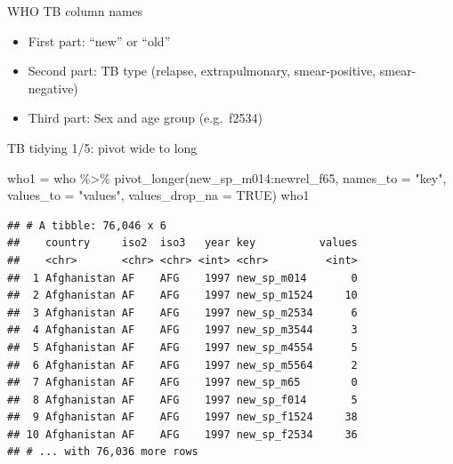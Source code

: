 \documentclass[
  ignorenonframetext,
]{beamer}
\newenvironment{Shaded}{\begin{snugshade}}{\end{snugshade}}
\newcommand{\AttributeTok}[1]{\textcolor[rgb]{0.77,0.63,0.00}{#1}}
\newcommand{\ConstantTok}[1]{\textcolor[rgb]{0.00,0.00,0.00}{#1}}
\newcommand{\FunctionTok}[1]{\textcolor[rgb]{0.00,0.00,0.00}{#1}}
\newcommand{\NormalTok}[1]{#1}
\newcommand{\OtherTok}[1]{\textcolor[rgb]{0.56,0.35,0.01}{#1}}
\newcommand{\SpecialCharTok}[1]{\textcolor[rgb]{0.00,0.00,0.00}{#1}}
\newcommand{\StringTok}[1]{\textcolor[rgb]{0.31,0.60,0.02}{#1}}
\providecommand{\tightlist}{%
  \setlength{\itemsep}{0pt}\setlength{\parskip}{0pt}}
\begin{document}
\begin{frame}{WHO TB column names}
\protect\hypertarget{who-tb-column-names}{}
\begin{itemize}
\tightlist
\item
  First part: ``new'' or ``old''
\item
  Second part: TB type (relapse, extrapulmonary, smear-positive,
  smear-negative)
\item
  Third part: Sex and age group (e.g.~f2534)
\end{itemize}
\end{frame}

\begin{frame}[fragile]{TB tidying 1/5: pivot wide to long}
\protect\hypertarget{tb-tidying-15-pivot-wide-to-long}{}
\begin{Shaded}
\begin{Highlighting}[]
\NormalTok{who1 }\OtherTok{=}\NormalTok{ who }\SpecialCharTok{\%\textgreater{}\%} 
  \FunctionTok{pivot\_longer}\NormalTok{(new\_sp\_m014}\SpecialCharTok{:}\NormalTok{newrel\_f65, }
               \AttributeTok{names\_to =} \StringTok{"key"}\NormalTok{, }
               \AttributeTok{values\_to =} \StringTok{"values"}\NormalTok{, }
               \AttributeTok{values\_drop\_na =} \ConstantTok{TRUE}\NormalTok{)}
\NormalTok{who1}
\end{Highlighting}
\end{Shaded}

\begin{verbatim}
## # A tibble: 76,046 x 6
##    country     iso2  iso3   year key          values
##    <chr>       <chr> <chr> <int> <chr>         <int>
##  1 Afghanistan AF    AFG    1997 new_sp_m014       0
##  2 Afghanistan AF    AFG    1997 new_sp_m1524     10
##  3 Afghanistan AF    AFG    1997 new_sp_m2534      6
##  4 Afghanistan AF    AFG    1997 new_sp_m3544      3
##  5 Afghanistan AF    AFG    1997 new_sp_m4554      5
##  6 Afghanistan AF    AFG    1997 new_sp_m5564      2
##  7 Afghanistan AF    AFG    1997 new_sp_m65        0
##  8 Afghanistan AF    AFG    1997 new_sp_f014       5
##  9 Afghanistan AF    AFG    1997 new_sp_f1524     38
## 10 Afghanistan AF    AFG    1997 new_sp_f2534     36
## # ... with 76,036 more rows
\end{verbatim}
\end{frame}
\end{document}
